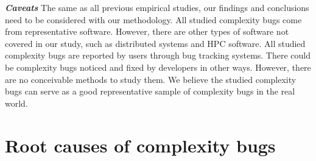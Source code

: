 {\bf{\textit{Caveats}}}
The same as all previous empirical studies, 
our findings and conclusions need to be considered with our methodology.
All studied complexity bugs come from representative software. 
However, there are other types of software not covered in our study, 
such as distributed systems and HPC software. 
All studied complexity bugs are reported by users through bug tracking systems.  
There could be complexity bugs noticed and fixed by developers in other ways. 
However, there are no conceivable methods to study them.
We believe the studied complexity bugs can serve as a good representative sample
of complexity bugs in the real world. 

\section{Root causes of complexity bugs}



